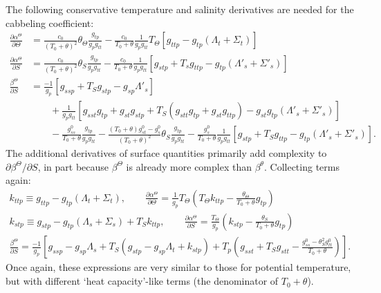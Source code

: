 \documentclass{article}
\begin{document}
The following conservative temperature and salinity derivatives are needed for the cabbeling coefficient:
\begin{align*}
    \frac{\partial \alpha^{\Theta}}{\partial \Theta} &= \frac{c_0}{(T_0 + \theta)^2} \theta_{\Theta} \frac{g_{tp}}{g_p g_{tt}} - \frac{c_0}{T_0 + \theta} \frac{1}{g_p g_{tt}} T_{\Theta} \left[ g_{ttp} - g_{tp} (\Lambda_t + \Sigma_t) \right] \\
    \frac{\partial \alpha^{\Theta}}{\partial S} &= \frac{c_0}{(T_0 + \theta)^2} \theta_S \frac{g_{tp}}{g_p g_{tt}} - \frac{c_0}{T_0 + \theta} \frac{1}{g_p g_{tt}} \left[ g_{stp} + T_s g_{ttp} - g_{tp} (\Lambda'_s + \Sigma'_s) \right] \\
    \frac{\beta^{\Theta}}{\partial S} &= \frac{-1}{g_p} \left[ g_{ssp} + T_S g_{stp} - g_{sp} \Lambda'_s \right] \\
    &\qquad + \frac{1}{g_p g_{tt}} \left[ g_{sst} g_{tp} + g_{st} g_{stp} + T_S \left( g_{stt} g_{tp} + g_{st} g_{ttp} \right) - g_{st} g_{tp} (\Lambda'_s + \Sigma'_s) \right] \\
    &\qquad - \frac{g^0_{ss}}{T_0 + \theta} \frac{g_{tp}}{g_p g_{tt}} - \frac{(T_0 + \theta) g^0_{st} - g^0_s}{(T_0 + \theta)^2} \theta_S \frac{g_{tp}}{g_p g_{tt}} - \frac{g^0_s}{T_0 + \theta} \frac{1}{g_p g_{tt}} \left[ g_{stp} + T_S g_{ttp} - g_{tp} (\Lambda'_s + \Sigma'_s) \right].
\end{align*}
The additional derivatives of surface quantities primarily add complexity to $\partial \beta^{\Theta}/\partial S$, in part because $\beta^{\Theta}$ is already more complex than $\beta^{\theta}$. Collecting terms again:
\begin{gather*}
    k_{ttp} \equiv g_{ttp} - g_{tp} (\Lambda_t + \Sigma_t), \qquad \frac{\partial \alpha^{\Theta}}{\partial \Theta} = \frac{1}{g_p} T_{\Theta} \left( T_{\Theta} k_{ttp} - \frac{\theta_{\Theta}}{T_0 + \theta} g_{tp} \right) \\
    k_{stp} \equiv g_{stp} - g_{tp} (\Lambda_s + \Sigma_s) + T_S k_{ttp}, \qquad \frac{\partial \alpha^{\Theta}}{\partial S} = \frac{T_{\Theta}}{g_p} \left( k_{stp} - \frac{\theta_S}{T_0 + \theta} g_{tp} \right) \\
    \frac{\beta^{\Theta}}{\partial S} = \frac{-1}{g_p} \left[ g_{ssp} - g_{sp} \Lambda_s + T_S \left( g_{stp} - g_{sp} \Lambda_t + k_{stp} \right) + T_p \left( g_{sst} + T_S g_{stt} - \frac{g^0_{ss} - \theta_S^2 g^0_{tt}}{T_0 + \theta} \right) \right].
\end{gather*}
Once again, these expressions are very similar to those for potential temperature, but with different `heat capacity'-like terms (the denominator of $T_0 + \theta$).
\end{document}

